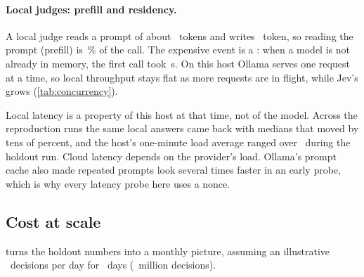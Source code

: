 \paragraph{Local judges: prefill and residency.} A local judge reads a prompt of about
\LatPromptTokens\ tokens and writes \LatDecodeTokens\ token, so reading the prompt (prefill) is
\LatPrefillShareRange\,\% of the call. The expensive event is a : when a model is not
already in memory, the first call took \LatColdRange\,s. On this host Ollama serves one request at a
time, so local throughput stays flat as more requests are in flight, while Jev's grows
(\cref{tab:concurrency}).

\begin{table}[htbp]
\centering\small
\caption{Latency and throughput as requests in flight rise. $^{*}$ GPT-6 Luna at 8 in flight had
\LatLunaConcErrors\ read timeout; its throughput counts successful requests only.}
\label{tab:concurrency}

\end{table}

\begin{caution}
Local latency is a property of this host at that time, not of the model. Across the reproduction runs
the same local answers came back with medians that moved by tens of percent, and the host's one-minute
load average ranged over \HoldLoadRange\ during the holdout run. Cloud latency depends on the provider's
load. Ollama's prompt cache also made repeated prompts look several times faster in an early probe,
which is why every latency probe here uses a nonce.
\end{caution}

\subsection{Cost at scale}

 turns the holdout numbers into a monthly picture, assuming an illustrative
\ProjPerDay\ decisions per day for \ProjDays\ days (\ProjPerMonthM\ million decisions).

\begin{table}[htbp]
\centering\small
\caption{Projected monthly API cost and wrong automatic actions at \ProjPerDay\ decisions per day,
using holdout rates \prereg. Local judges show \$0 API cost and exclude hardware, power and operations.}
\label{tab:cost}

\end{table}

